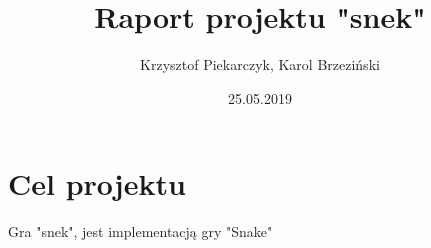 \documentclass[12pt]{article}
\title{Raport projektu "snek"}
\author{Krzysztof Piekarczyk, Karol Brzeziński}
\date{25.05.2019}
\begin{document}
\maketitle


\section{Cel projektu}

Gra "snek", jest implementacją gry "Snake"
\end{document}
